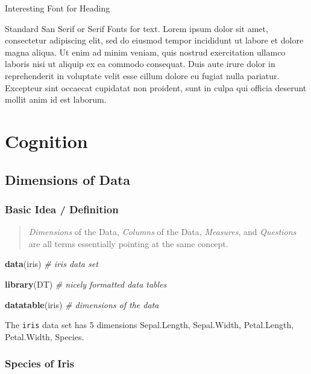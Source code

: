 \documentclass[]{tufte-handout}
\newenvironment{Shaded}{\begin{snugshade}}{\end{snugshade}}
\newcommand{\CommentTok}[1]{\textcolor[rgb]{0.56,0.35,0.01}{\textit{#1}}}
\newcommand{\KeywordTok}[1]{\textcolor[rgb]{0.13,0.29,0.53}{\textbf{#1}}}
\newcommand{\NormalTok}[1]{#1}
\begin{document}
Interesting Font for Heading

Standard San Serif or Serif Fonts for text. Lorem ipsum dolor sit amet,
consectetur adipiscing elit, sed do eiusmod tempor incididunt ut labore
et dolore magna aliqua. Ut enim ad minim veniam, quis nostrud
exercitation ullamco laboris nisi ut aliquip ex ea commodo consequat.
Duis aute irure dolor in reprehenderit in voluptate velit esse cillum
dolore eu fugiat nulla pariatur. Excepteur sint occaecat cupidatat non
proident, sunt in culpa qui officia deserunt mollit anim id est laborum.

\hypertarget{cognition}{%
\section{Cognition}\label{cognition}}

\hypertarget{dimensions-of-data}{%
\subsection{Dimensions of Data}\label{dimensions-of-data}}

\hypertarget{basic-idea-definition}{%
\subsubsection{Basic Idea / Definition}\label{basic-idea-definition}}

\begin{quote}
\emph{Dimensions} of the Data, \emph{Columns} of the Data,
\emph{Measures}, and \emph{Questions} are all terms essentially pointing
at the same concept.
\end{quote}

\begin{Shaded}
\begin{Highlighting}[]
\KeywordTok{data}\NormalTok{(iris)  }\CommentTok{# iris data set}

\KeywordTok{library}\NormalTok{(DT)  }\CommentTok{# nicely formatted data tables}

\KeywordTok{datatable}\NormalTok{(iris)  }\CommentTok{# dimensions of the data}
\end{Highlighting}
\end{Shaded}

\hypertarget{htmlwidget-0cd13bcaceee80741eed}{}

The \texttt{iris} data set has 5 dimensions Sepal.Length, Sepal.Width,
Petal.Length, Petal.Width, Species.

\hypertarget{species-of-iris}{%
\subsubsection{Species of Iris}\label{species-of-iris}}
\end{document}
